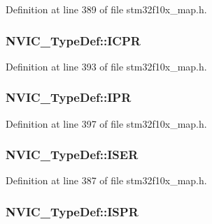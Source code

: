 Definition at line 389 of file stm32f10x\+\_\+map.\+h.

\subsubsection[{\texorpdfstring{I\+C\+PR}{ICPR}}]{ N\+V\+I\+C\+\_\+\+Type\+Def\+::\+I\+C\+PR}\hypertarget{struct_n_v_i_c___type_def_a5ab796b9897db828c821595afce3bb62}{}\label{struct_n_v_i_c___type_def_a5ab796b9897db828c821595afce3bb62}


Definition at line 393 of file stm32f10x\+\_\+map.\+h.

\subsubsection[{\texorpdfstring{I\+PR}{IPR}}]{ N\+V\+I\+C\+\_\+\+Type\+Def\+::\+I\+PR}\hypertarget{struct_n_v_i_c___type_def_adebedbb31feecef5c25d9ecd004cb248}{}\label{struct_n_v_i_c___type_def_adebedbb31feecef5c25d9ecd004cb248}


Definition at line 397 of file stm32f10x\+\_\+map.\+h.

\subsubsection[{\texorpdfstring{I\+S\+ER}{ISER}}]{ N\+V\+I\+C\+\_\+\+Type\+Def\+::\+I\+S\+ER}\hypertarget{struct_n_v_i_c___type_def_a38dbc793122fe4e943522de96d289292}{}\label{struct_n_v_i_c___type_def_a38dbc793122fe4e943522de96d289292}


Definition at line 387 of file stm32f10x\+\_\+map.\+h.

\subsubsection[{\texorpdfstring{I\+S\+PR}{ISPR}}]{ N\+V\+I\+C\+\_\+\+Type\+Def\+::\+I\+S\+PR}\hypertarget{struct_n_v_i_c___type_def_a8722eeb170cc4c0e3bc49a167060a2d9}{}\label{struct_n_v_i_c___type_def_a8722eeb170cc4c0e3bc49a167060a2d9}


